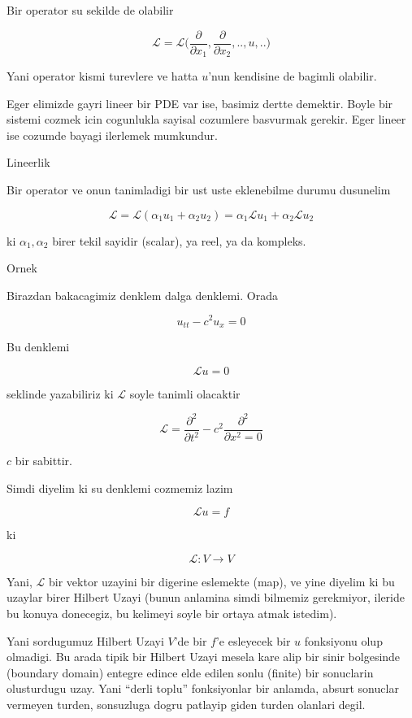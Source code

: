 \documentclass[12pt,fleqn]{article}
\begin{document}
Bir operator su sekilde de olabilir

\[ \mathcal{L} = \mathcal{L} \bigg(
\frac{\partial }{\partial x_1}, \frac{\partial }{\partial x_2},..,
u,..
\bigg)
 \]

Yani operator kismi turevlere ve hatta $u$'nun kendisine de bagimli
olabilir. 

Eger elimizde gayri lineer bir PDE var ise, basimiz dertte demektir. Boyle
bir sistemi cozmek icin cogunlukla sayisal cozumlere basvurmak
gerekir. Eger lineer ise cozumde bayagi ilerlemek mumkundur. 

Lineerlik

Bir operator ve onun tanimladigi bir ust uste eklenebilme durumu dusunelim

\[ \mathcal{L} = \mathcal{L}(\alpha_1 u_1 + \alpha_2 u_2) = 
\alpha_1 \mathcal{L}u_1 + \alpha_2 \mathcal{L}u_2 \]

ki $\alpha_1,\alpha_2$ birer tekil sayidir (scalar), ya reel, ya da kompleks. 

Ornek

Birazdan bakacagimiz denklem dalga denklemi. Orada

\[ u_{tt} - c^2u_x = 0 \]

Bu denklemi

\[ \mathcal{L}u = 0 \]

seklinde yazabiliriz ki $\mathcal{L}$ soyle tanimli olacaktir

\[ \mathcal{L} = \frac{\partial^2}{\partial t^2} - 
c^2 \frac{\partial ^2}{\partial x^2 = 0}\]

$c$ bir sabittir. 

Simdi diyelim ki su denklemi cozmemiz lazim

\[\mathcal{L} u = f \]

ki

\[ \mathcal{L}: V \to V \]

Yani, $\mathcal{L}$ bir vektor uzayini bir digerine eslemekte (map), ve yine diyelim
ki bu uzaylar birer Hilbert Uzayi (bunun anlamina simdi bilmemiz
gerekmiyor, ileride bu konuya donecegiz, bu kelimeyi soyle bir ortaya atmak
istedim). 

Yani sordugumuz Hilbert Uzayi $V$'de bir $f$'e esleyecek bir $u$ fonksiyonu
olup olmadigi. Bu arada tipik bir Hilbert Uzayi mesela kare alip bir sinir
bolgesinde (boundary domain) entegre edince elde edilen sonlu (finite) bir
sonuclarin olusturdugu uzay. Yani ``derli toplu'' fonksiyonlar bir anlamda,
absurt sonuclar vermeyen turden, sonsuzluga dogru patlayip giden turden
olanlari degil. 
\end{document}
